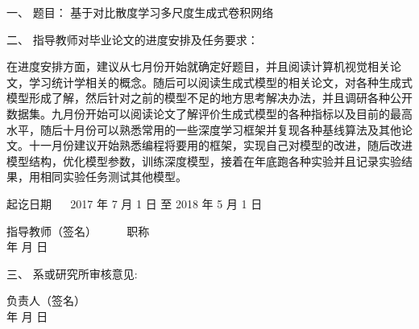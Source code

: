 
{
	\setlength{\parindent}{0em}
	\renewcommand{\baselinestretch}{2}
	\fangsong\xiaosi\bfseries
	
	一、 \; 题目： \; 基于对比散度学习多尺度生成式卷积网络
	\vspace{2em}

	二、 \; 指导教师对毕业论文的进度安排及任务要求：
	\vspace{2em}
	
}	

{
	\fangsong\xiaosi
	在进度安排方面，建议从七月份开始就确定好题目，并且阅读计算机视觉相关论文，学习统计学相关的概念。随后可以阅读生成式模型的相关论文，对各种生成式模型形成了解，然后针对之前的模型不足的地方思考解决办法，并且调研各种公开数据集。九月份开始可以阅读论文了解评价生成式模型的各种指标以及目前的最高水平，随后十月份可以熟悉常用的一些深度学习框架并复现各种基线算法及其他论文。十一月份建议开始熟悉编程将要用的框架，实现自己对模型的改进，随后改进模型结构，优化模型参数，训练深度模型，接着在年底跑各种实验并且记录实验结果，用相同实验任务测试其他模型。
}

	\vspace{2cm}

{
	\setlength{\parindent}{0em}
	\fangsong\xiaosi\bfseries
	
	起讫日期 ~~ 2017 年  7 月 1 日 至 2018 年 5 月 1 日
	
	\begin{flushright}
		指导教师（签名） \; \underline{\hspace{6em}} ~~~~ 职称 \; \underline{\hspace{3em}}\\
		年 \qquad 月 \qquad 日
	\end{flushright}
}


{
	\setlength{\parindent}{0em}
	\renewcommand{\baselinestretch}{2}
	\fangsong\xiaosi\bfseries
	
	三、 \; 系或研究所审核意见:
	
	\vspace{2cm}
}

{
	\fangsong\xiaosi\bfseries
	
	\begin{flushright}
	负责人（签名） \; \underline{\hspace{6em}} \\
	年 \qquad 月 \qquad 日
	\end{flushright}
}

\newpage


